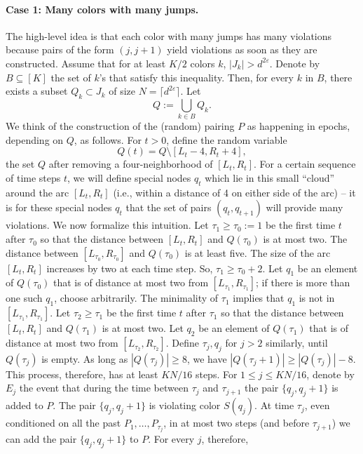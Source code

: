 \paragraph{Case 1: Many colors with many jumps.}
The high-level idea is that each color with many jumps has many violations because pairs of the form $(j,j+1)$ yield violations as soon as they are constructed.
Assume that for at least $K/2$ colors $k$, $|J_k|>d^{2\varepsilon}$. Denote by $B\subseteq[K]$ the set of $k$'s that satisfy this inequality. Then, for every $k$ in $B$, there exists a subset $Q_k\subset J_k$ of size $N=\lceil d^{2\varepsilon}\rceil$. Let
\[Q:=\bigcup_{k\in B}Q_k.\]
We think of the construction of the (random) pairing $P$ as happening in epochs, depending on $Q$, as follows.
For $t>0$, define the random variable
\[Q(t)=Q\setminus[L_t-4,R_t+4],\]
the set $Q$ after removing a four-neighborhood of $[L_t,R_t]$. For a certain sequence of time steps $t$, we will define special nodes $q_t$ which lie in this small ``cloud'' around the arc $[L_t,R_t]$ (i.e., within a distance of 4 on either side of the arc) -- it is for these special nodes $q_t$ that the set of pairs $(q_t,q_{t+1})$ will provide many violations. We now formalize this intuition.
Let $\tau_1\geq\tau_0:=1$ be the first time $t$ after $\tau_0$ so that the distance between $[L_t,R_t]$ and $Q(\tau_0)$ is at most two. The distance between $[L_{\tau_0},R_{\tau_0}]$ and $Q(\tau_0)$ is at least five. The size of the arc $[L_t,R_t]$ increases by two at each time step. So, $\tau_1\geq\tau_0+2$. Let $q_1$ be an element of $Q(\tau_0)$ that is of distance at most two from $[L_{\tau_1},R_{\tau_1}]$; if there is more than one such $q_1$, choose arbitrarily. The minimality of $\tau_1$ implies that $q_1$ is not in $[L_{\tau_1},R_{\tau_1}]$.
Let $\tau_2\geq\tau_1$ be the first time $t$ after $\tau_1$ so that the distance between $[L_t,R_t]$ and $Q(\tau_1)$ is at most two. Let $q_2$ be an element of $Q(\tau_1)$ that is of distance at most two from $[L_{\tau_2},R_{\tau_2}]$. Define $\tau_j,q_j$ for $j>2$ similarly, until $Q(\tau_j)$ is empty. As long as $|Q(\tau_j)|\geq8$, we have $|Q(\tau_j+1)|\geq|Q(\tau_j)|-8$. This process, therefore, has at least $KN/16$ steps. For $1\leq j\leq KN/16$, denote by $E_j$ the event that during the time between $\tau_j$ and $\tau_{j+1}$ the pair $\{q_j,q_j+1\}$ is added to $P$. The pair $\{q_j,q_j+1\}$ is violating color $S(q_j)$. At time $\tau_j$, even conditioned on all the past $P_1,\ldots,P_{\tau_j}$, in at most two steps (and before $\tau_{j+1}$) we can add the pair $\{q_j,q_j+1\}$ to $P$. For every $j$, therefore,
